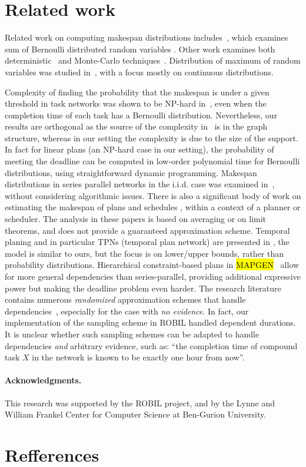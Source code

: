 \documentclass[review]{elsarticle}
\begin{document}
\section{Related work}
Related work on computing makespan distributions includes~\cite{hong2013computing}, which examines sum of  Bernoulli distributed random variables .
Other work examines both deterministic~\cite{mercier2007discrete} and  Monte-Carlo techniques~\cite{bucher1988adaptive,lipton1990practical}. 
Distribution of maximum of random variables  was studied in~\cite{devroye1980generating}, with a focus mostly on continuous distributions.

Complexity of finding the probability that the makespan is under a given threshold in task networks was shown to
be NP-hard in~\cite{hagstrom1988computational}, even when the completion time of each task has a Bernoulli distribution.
Nevertheless, our results are orthogonal as the source of the complexity in~\cite{hagstrom1988computational} is in the graph structure,
whereas in our setting the complexity is due to the size of the support. In fact for linear plans (an NP-hard case in our setting),
the probability of meeting the deadline can be computed in low-order polynomial time for Bernoulli distributions, using straightforward dynamic programming.
Makespan distributions in series parallel networks in the i.i.d. case was examined in~\cite{gutjahr1992average}, without   
considering algorithmic issues. There is also a significant body of work on estimating the makespan of plans and schedules
\cite{herroelen2005project,fu2010towards,beck2007proactive}, within a context of a planner or scheduler. The analysis in these papers is
based on averaging or on limit theorems, and does not provide a guaranteed approximation scheme. 
Temporal planing and in particular TPNs (temporal plan network) are presented in
\cite{kim2001executing}, the model is similar to ours, but the focus is on lower/upper bounds, rather than probability distributions. 
Hierarchical constraint-based plans in \hl{MAPGEN}~\cite{bresina2005mixed} allow for more
general dependencies than series-parallel, providing additional expressive power but making the deadline problem even harder.
The research literature contains numerous {\em randomized} approximation schemes that handle dependencies~\cite{Pearl,Yuan20061189}, especially for
the case with {\em no evidence}. In fact, our implementation of the sampling scheme in ROBIL handled dependent durations.
It is unclear whether such sampling schemes can be adapted to handle dependencies {\em and} arbitrary evidence, such as: ``the completion time of
compound task $X$ in the network is known to be exactly one hour from now''.


\paragraph{Acknowledgments.} This research was supported by the ROBIL project, and by the Lynne and William Frankel Center for Computer Science at Ben-Gurion University.

\section*{Refferences}

\end{document}
